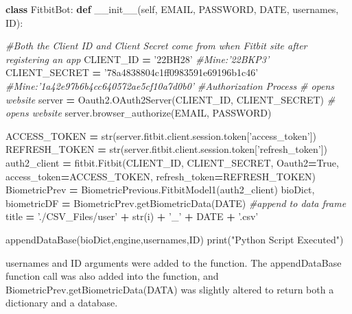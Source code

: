 \documentclass[]{book}
\newenvironment{Shaded}{\begin{snugshade}}{\end{snugshade}}
\newcommand{\KeywordTok}[1]{\textcolor[rgb]{0.13,0.29,0.53}{\textbf{#1}}}
\newcommand{\StringTok}[1]{\textcolor[rgb]{0.31,0.60,0.02}{#1}}
\newcommand{\CommentTok}[1]{\textcolor[rgb]{0.56,0.35,0.01}{\textit{#1}}}
\newcommand{\FunctionTok}[1]{\textcolor[rgb]{0.00,0.00,0.00}{#1}}
\newcommand{\VariableTok}[1]{\textcolor[rgb]{0.00,0.00,0.00}{#1}}
\newcommand{\OperatorTok}[1]{\textcolor[rgb]{0.81,0.36,0.00}{\textbf{#1}}}
\newcommand{\BuiltInTok}[1]{#1}
\newcommand{\NormalTok}[1]{#1}
\begin{document}
\begin{Shaded}
\begin{Highlighting}[]
\KeywordTok{class}\NormalTok{ FitbitBot:}
    \KeywordTok{def} \FunctionTok{__init__}\NormalTok{(}\VariableTok{self}\NormalTok{, EMAIL, PASSWORD, DATE, usernames, ID):}
 
        \CommentTok{#Both the Client ID and Client Secret come from when Fitbit site after registering an app}
\NormalTok{        CLIENT_ID }\OperatorTok{=} \StringTok{'22BH28'} \CommentTok{#Mine:'22BKP3'}
\NormalTok{        CLIENT_SECRET }\OperatorTok{=} \StringTok{'78a4838804c1ff0983591e69196b1c46'} \CommentTok{#Mine:'1a42e97b6b4cc640572ae5cf10a7d0b0'}
        \CommentTok{#Authorization Process}
        \CommentTok{# opens website}
\NormalTok{        server }\OperatorTok{=}\NormalTok{ Oauth2.OAuth2Server(CLIENT_ID, CLIENT_SECRET)}
        \CommentTok{# opens website}
\NormalTok{        server.browser_authorize(EMAIL, PASSWORD)}

\NormalTok{        ACCESS_TOKEN }\OperatorTok{=} \BuiltInTok{str}\NormalTok{(server.fitbit.client.session.token[}\StringTok{'access_token'}\NormalTok{])}
\NormalTok{        REFRESH_TOKEN }\OperatorTok{=} \BuiltInTok{str}\NormalTok{(server.fitbit.client.session.token[}\StringTok{'refresh_token'}\NormalTok{])}
\NormalTok{        auth2_client }\OperatorTok{=}\NormalTok{ fitbit.Fitbit(CLIENT_ID, CLIENT_SECRET, Oauth2}\OperatorTok{=}\VariableTok{True}\NormalTok{, access_token}\OperatorTok{=}\NormalTok{ACCESS_TOKEN,}
\NormalTok{        refresh_token}\OperatorTok{=}\NormalTok{REFRESH_TOKEN)}
\NormalTok{        BiometricPrev }\OperatorTok{=}\NormalTok{ BiometricPrevious.FitbitModel1(auth2_client)}
\NormalTok{        bioDict, biometricDF }\OperatorTok{=}\NormalTok{ BiometricPrev.getBiometricData(DATE) }\CommentTok{#append to data frame}
\NormalTok{        title }\OperatorTok{=} \StringTok{'./CSV_Files/user'} \OperatorTok{+} \BuiltInTok{str}\NormalTok{(i) }\OperatorTok{+} \StringTok{'_'} \OperatorTok{+}\NormalTok{ DATE }\OperatorTok{+} \StringTok{'.csv'}

\NormalTok{        appendDataBase(bioDict,engine,usernames,ID)}
        \BuiltInTok{print}\NormalTok{(}\StringTok{"Python Script Executed"}\NormalTok{)}
\end{Highlighting}
\end{Shaded}

usernames and ID arguments were added to the function. The
appendDataBase function call was also added into the function, and
BiometricPrev.getBiometricData(DATA) was slightly altered to return both
a dictionary and a database.
\end{document}
